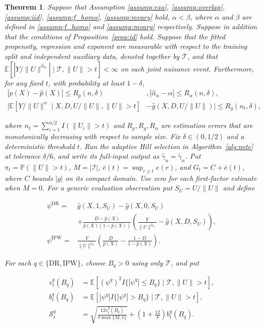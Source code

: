 \documentclass[12pt]{article}
\theoremstyle{plain}
\newtheorem{theorem}{Theorem}[section]
\theoremstyle{definition}
\begin{document}
\begin{theorem}
  \label{thm:rate} Suppose that Assumption \ref{assump:exo}, \ref{assump:overlap}, \ref{assump:iid}, \ref{assump:f_homo}, \ref{assump:mvary} hold, $\alpha < \beta$, where $\alpha$ and $\beta$ are defined in \cref{assump:f_homo} and \cref{assump:mvary} respectively. Suppose in addition that the conditions of Proposition~\ref{prop:id} hold. Suppose that the fitted propensity, regression and exponent are measurable with respect to the training split and independent auxiliary data, denoted together by $\mathcal T$, and that $\mathbb E[|Y/\|U\|^{\hat\alpha_n}|\mid\mathcal T,\|U\|>t]<\infty$ on each joint nuisance event. Furthermore, for any fixed $t$, with probability at least $1 -
  \delta$,
  \begin{align*}
    |p (X) - \hat{p} (X) | \leqslant R_p (n, \delta) & ,  | \hat{\alpha}_{n} - \alpha| \leqslant R_\alpha(n,\delta),\\
    |\mathbb{E}[Y/\|U\|^{\alpha} \mid X, D, U /\|U\|, \|U\|> t] &- \hat{g} (X, D, U /\|U\|)
    | \leqslant R_g (n_t, \delta),
  \end{align*}
  
  where $n_t = \sum_{i = 1}^{n/2} I (\|U_i \|> t)$ and $R_p, R_g, R_\alpha$ are estimation
  errors that are monotonically decreasing with respect to sample size. Fix $\delta\in(0,1/2)$ and a deterministic threshold $t$. Run the adaptive Hill selection in Algorithm~\ref{alg:nete} at tolerance $\delta/6$, and write its full-input output as $\hat\gamma_n=\widetilde\gamma_n$. Put $\pi_t=\mathbb P(\|U\|>t)$, $M=|\mathcal I|$, $\bar e(t)=\sup_{r\geq t}e(r)$, and $G_t=C+\bar e(t)$, where $C$ bounds $|g|$ on its compact domain. Use zero for each first-factor estimate when $M=0$. For a generic evaluation observation put $S_U=U/\|U\|$ and define

\[
\begin{aligned}
\psi^{\mathrm{DR}}={}&\hat g(X,1,S_U)-\hat g(X,0,S_U)\\
&+\frac{D-\hat p(X)}{\hat p(X)(1-\hat p(X))}\left(\frac{Y}{\|U\|^{\hat\alpha_n}}-\hat g(X,D,S_U)\right),\\
\psi^{\mathrm{IPW}}={}&\frac{Y}{\|U\|^{\hat\alpha_n}}\left(\frac{D}{\hat p(X)}-\frac{1-D}{1-\hat p(X)}\right).
\end{aligned}
\]

For each $q\in\{\mathrm{DR},\mathrm{IPW}\}$, choose $B_q>0$ using only $\mathcal T$, and put

\[
\begin{aligned}
v_t^q(B_q)&=\mathbb E[(\psi^q)^2I\{|\psi^q|\leq B_q\}\mid\mathcal T,\|U\|>t],\\
b_t^q(B_q)&=\mathbb E[|\psi^q|I\{|\psi^q|>B_q\}\mid\mathcal T,\|U\|>t],\\
\mathcal S_t^q&=\sqrt{\frac{12v_t^q(B_q)}{\delta\max\{M,1\}}}+\left(1+\frac{12}{\delta}\right)b_t^q(B_q).
\end{aligned}
\]


\end{theorem}
\end{document}
